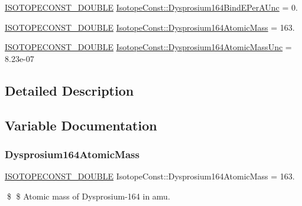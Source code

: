 \begin{DoxyCompactItemize}
\item 
\mbox{\hyperlink{group___isotope_const-_macros_ga8f45a7272ce02c0b4c65c44636ed719a}{I\+S\+O\+T\+O\+P\+E\+C\+O\+N\+S\+T\+\_\+\+D\+O\+U\+B\+LE}} \mbox{\hyperlink{group___isotope_const-_dysprosium-_dy164_ga4add95c4ff7572e36931798ade8b71e5}{Isotope\+Const\+::\+Dysprosium164\+Bind\+E\+Per\+A\+Unc}} = 0.
\item 
\mbox{\hyperlink{group___isotope_const-_macros_ga8f45a7272ce02c0b4c65c44636ed719a}{I\+S\+O\+T\+O\+P\+E\+C\+O\+N\+S\+T\+\_\+\+D\+O\+U\+B\+LE}} \mbox{\hyperlink{group___isotope_const-_dysprosium-_dy164_gac4fcd3fb18fc37974f9c8218ebb86c43}{Isotope\+Const\+::\+Dysprosium164\+Atomic\+Mass}} = 163.
\item 
\mbox{\hyperlink{group___isotope_const-_macros_ga8f45a7272ce02c0b4c65c44636ed719a}{I\+S\+O\+T\+O\+P\+E\+C\+O\+N\+S\+T\+\_\+\+D\+O\+U\+B\+LE}} \mbox{\hyperlink{group___isotope_const-_dysprosium-_dy164_gaace5d1e344300ab85d71b2daf7d0cee7}{Isotope\+Const\+::\+Dysprosium164\+Atomic\+Mass\+Unc}} = 8.\+23e-\/07
\end{DoxyCompactItemize}


\subsection{Detailed Description}


\subsection{Variable Documentation}
\mbox{\label{group___isotope_const-_dysprosium-_dy164_gac4fcd3fb18fc37974f9c8218ebb86c43}} 
\subsubsection{\texorpdfstring{Dysprosium164\+Atomic\+Mass}{Dysprosium164AtomicMass}}
{\footnotesize\ttfamily \mbox{\hyperlink{group___isotope_const-_macros_ga8f45a7272ce02c0b4c65c44636ed719a}{I\+S\+O\+T\+O\+P\+E\+C\+O\+N\+S\+T\+\_\+\+D\+O\+U\+B\+LE}} Isotope\+Const\+::\+Dysprosium164\+Atomic\+Mass = 163.}

\$ \$ Atomic mass of Dysprosium-\/164 in amu. \mbox{\label{group___isotope_const-_dysprosium-_dy164_gaace5d1e344300ab85d71b2daf7d0cee7}} 
